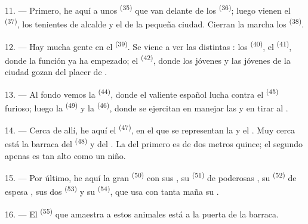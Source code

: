11. --- Primero, he aquí a unos  \textsuperscript{(35)} que van
delante de los  \textsuperscript{(36)}; luego vienen el
 \textsuperscript{(37)}, los tenientes de alcalde y el
 de la pequeña ciudad. Cierran la marcha los
 \textsuperscript{(38)}.

\VUsaut{5.0mm}
\VUsaut{3.6mm}

12. --- Hay mucha gente en el  \textsuperscript{(39)}. Se
viene a ver las distintas : los  \textsuperscript{(40)}, el  \textsuperscript{(41)}, donde la función
ya ha empezado; el  \textsuperscript{(42)}, donde los jóvenes y
las jóvenes de la ciudad gozan del placer de .

13. --- Al fondo vemos la  \textsuperscript{(44)}, donde el
valiente  español lucha contra el 
\textsuperscript{(45)} furioso; luego la  \textsuperscript{(49)} y la
 \textsuperscript{(46)}, donde se ejercitan en manejar las
 y en tirar al .

14. --- Cerca de allí, he aquí el  \textsuperscript{(47)}, en
el que se representan la  y el . Muy cerca está
la barraca del  \textsuperscript{(48)} y del . La
 del primero es de dos metros quince; el segundo apenas es
tan alto como un niño.

15. --- Por último, he aquí la gran 
\textsuperscript{(50)} con sus , su 
\textsuperscript{(51)} de poderosas , su  \textsuperscript{(52)}
de espesa , sus dos  \textsuperscript{(53)} y su
 \textsuperscript{(54)}, que usa con tanta maña su .

16. --- El  \textsuperscript{(55)} que amaestra a estos animales está
a la puerta de la barraca.
\VUsaut{6.0mm}
\VUfilet{22mm}
